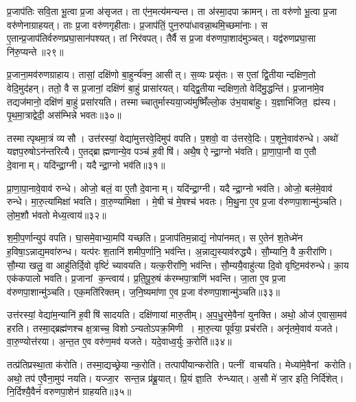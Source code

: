 प्र॒जाप॑तिः सवि॒ता भू॒त्वा प्र॒जा अ॑सृजत।
ता ए॑न॒मत्य॑मन्यन्त।
ता अ॑स्मा॒दपाक्रामन्।
ता वरु॑णो भू॒त्वा प्र॒जा वरु॑णेनाग्राहयत्।
ताः प्र॒जा वरु॑णगृहीताः।
प्र॒जाप॑तिं॒ पुन॒रुपा॑धावन्ना॒थमि॒च्छमा॑नाः।
स ए॒तान्प्र॒जाप॑तिर्वरुण\-प्रघा॒सान॑पश्यत्।
तां निर॑वपत्।
तैर्वै स प्र॒जा व॑रुणपा॒शाद॑मुञ्चत्।
यद्व॑रुणप्रघा॒सा नि॑रु॒प्यन्ते॥२९॥

प्र॒जाना॒मव॑रुणग्राहाय।
तासां॒ दक्षि॑णो बा॒हुर्न्य॑क्न॒ आसीत्।
स॒व्यः प्रसृ॑तः।
स ए॒तां द्वि॒तीयान्दक्षिण॒तो वेदि॒मुद॑हन्।
ततो॒ वै स प्र॒जानां॒ दक्षि॑णं बा॒हुं प्रासा॑रयत्।
यद्द्वि॒तीयान्दक्षिण॒तो वेदि॑मु॒द्धन्ति॑।
प्र॒जाना॑मे॒व तद्यज॑मानो॒ दक्षि॑णं बा॒हुं प्रसा॑रयति।
तस्माच्चातुर्मास्यया॒ज्य॑मुष्मिँ॑ल्लो॒क उ॑भ॒याबा॑हुः।
य॒ज्ञाभि॑जित॒ ह्य॑स्य।
पृ॒थ॒मा॒त्राद्वेदी॒ अस॑म्भिन्ने भवतः॥३०॥

तस्मात्पृथमा॒त्रं व्यसौ।
उत्त॑रस्यां॒ वेद्या॑मुत्तरवे॒दिमुप॑ वपति।
प॒शवो॒ वा उ॑त्तरवे॒दिः।
प॒शूने॒वाव॑रुन्धे।
अथो॑ यज्ञप॒रुषोऽन॑न्तरित्यै।
ए॒तद्ब्राह्मणान्ये॒व पञ्च॑ ह॒वीषि॑।
अथै॒ष ऐन्द्रा॒ग्नो भ॑वति।
प्रा॒णा॒पा॒नौ वा ए॒तौ दे॒वानाम्।
यदि॑न्द्रा॒ग्नी।
यदैन्द्रा॒ग्नो भव॑ति॥३१॥

प्रा॒णा॒पा॒नावे॒वाव॑ रुन्धे।
ओजो॒ बलं॒ वा ए॒तौ दे॒वानाम्।
यदि॑न्द्रा॒ग्नी।
यदैन्द्रा॒ग्नो भव॑ति।
ओजो॒ बल॑मे॒वाव॑ रुन्धे।
मा॒रु॒त्या॑मिक्षा॑ भवति।
वा॒रु॒ण्या॑मिक्षा।
मे॒षी च॑ मे॒षश्च॑ भवतः।
मि॒थु॒ना ए॒व प्र॒जा व॑रुणपा॒शान्मु॑ञ्चति।
लो॒म॒शौ भ॑वतो मेध्य॒त्वाय॑॥३२॥

श॒मी॒प॒र्णान्युप॑ वपति।
घा॒समे॒वाभ्या॒मपि॑ यच्छति।
प्र॒जाप॑तिम॒न्नाद्यं॒ नोपा॑नमत्।
स ए॒तेन॑ श॒तेध्मे॑न ह॒विषा॒ऽन्नाद्य॒मवा॑रुन्ध।
यत्प॑रः श॒तानि॑ शमीप॒र्णानि॒ भव॑न्ति।
अ॒न्नाद्य॒स्याव॑रुद्ध्यै।
सौ॒म्यानि॒ वै क॒रीरा॑णि।
सौ॒म्या खलु॒ वा आहु॑तिर्दि॒वो वृष्टिं॑ च्यावयति।
यत्क॒रीरा॑णि॒ भव॑न्ति।
सौ॒म्ययै॒वाहु॑त्या दि॒वो वृष्टि॒मव॑रुन्धे।
का॒य एक॑कपालो भवति।
प्र॒जानां क॒न्त्वाय॑।
प्र॒ति॒पू॒रु॒षं क॑रम्भपा॒त्राणि॑ भवन्ति।
जा॒ता ए॒व प्र॒जा व॑रुणपा॒शान्मु॑ञ्चति।
एक॒मति॑रिक्तम्।
ज॒नि॒ष्यमा॑णा ए॒व प्र॒जा व॑रुणपा॒शान्मु॑ञ्चति॥३३॥\anuvakamend[नि॒रु॒प्यन्ते॑ भवतो॒ भव॑ति मेध्य॒त्वाय॑ रुन्धे॒ षट्च॑]

उत्त॑रस्यां॒ वेद्या॑म॒न्यानि॑ ह॒वीषि॑ सादयति।
दक्षि॑णायां मारु॒तीम्।
अ॒प॒धु॒रमे॒वैना॑ युनक्ति।
अथो॒ ओज॑ ए॒वासा॒मव॑ हरति।
तस्मा॒द्ब्रह्म॑णश्च क्ष॒त्राच्च॒ विशोऽन्यतोऽपक्र॒मिणी।
मा॒रु॒त्या पूर्व॑या॒ प्रच॑रति।
अनृ॑तमे॒वाव॑ यजते।
वा॒रु॒ण्योत्त॑रया।
अ॒न्त॒त ए॒व वरु॑ण॒मव॑ यजते।
यदे॒वाध्व॒र्युः क॒रोति॑॥३४॥

तत्प्र॑तिप्रस्था॒ता क॑रोति।
तस्मा॒द्यच्छ्रेयान्क॒रोति॑।
तत्पापी॑यान्करोति।
पत्नीं वाचयति।
मेध्या॑मे॒वैनां करोति।
अथो॒ तप॑ ए॒वैना॒मुप॑ नयति।
यज्जा॒र सन्त॒न्न प्र॑ब्रू॒यात्।
प्रि॒यं ज्ञा॒ति रु॑न्ध्यात्।
अ॒सौ मे॑ जा॒र इति॒ निर्दि॑शेत्।
नि॒र्दिश्यै॒वैनं॑ वरुणपा॒शेन॑ ग्राहयति॥३५॥

